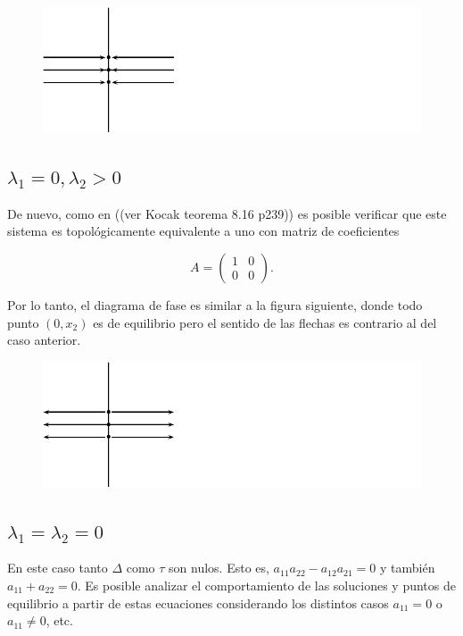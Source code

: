 \documentclass[11pt]{book}
\theoremstyle{definition}
\numberwithin{definition}{section}
\theoremstyle{theorem}
\numberwithin{theorem}{section}
\numberwithin{lemma}{section}
\numberwithin{corollary}{section}
\theoremstyle{plain}
\numberwithin{example}{section}
\begin{document}
\begin{figure}[!ht] \centering
    \includegraphics[scale=1.0]{figures/asingular_1.pdf}
\end{figure}

\subsection{$\lambda_1 = 0, \lambda_2 > 0$}
De nuevo, como en ((ver Kocak teorema 8.16 p239)) es posible verificar que este sistema es topológicamente equivalente a uno con matriz de coeficientes

$$ A = \left( \begin{array}{ll} 1 & 0 \\ 0 & 0 \end{array} \right).$$

Por lo tanto, el diagrama de fase es similar a la figura siguiente, donde todo punto $(0,x_2)$ es de equilibrio pero el sentido de las flechas es contrario al del caso anterior.

\begin{figure}[!ht] \centering
    \includegraphics[scale=1.0]{figures/asingular1.pdf}
\end{figure}

\subsection{$\lambda_1 = \lambda_2 = 0$}
En este caso tanto $\Delta$ como $\tau$ son nulos. Esto es, $a_{11}a_{22} - a_{12}a_{21} = 0$ y también $a_{11} + a_{22} = 0$.
Es posible analizar el comportamiento de las soluciones y puntos de equilibrio a partir de estas ecuaciones considerando los distintos casos $a_{11} = 0$ o $a_{11} \neq 0$, etc.
\end{document}
